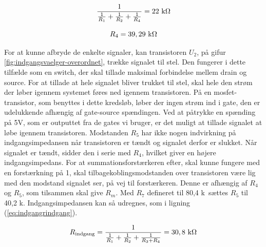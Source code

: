 \begin{equation}
\label{eq:indgangr4udregning}
\frac{1}{\frac{1}{R_1}+\frac{1}{R_2}+\frac{1}{R_4}}=22~\mathrm{k}\ohm
\end{equation}

\begin{equation}
\label{eq:indgangr4}
R_4=39,29~\mathrm{k}\ohm
\end{equation}

For at kunne afbryde de enkelte signaler, kan transistoren $U_2$, på gifur \ref{fig:indgangsvaelger-overordnet}, trække signalet til stel. Den fungerer i dette tilfælde som en switch, der skal tillade maksimal forbindelse mellem drain og source. For at tillade at hele signalet bliver trukket til stel, skal hele den strøm der løber igennem systemet føres ned igennem transistoren. På en mosfet-transistor, som benyttes i dette kredsløb, løber der ingen strøm ind i gate, den er udelukkende afhængig af gate-source spændingen. Ved at påtrykke en spænding på 5V, som er outputtet fra de gates vi bruger, er det muligt at tillade signalet at løbe igennem transistoren.
Modstanden $R_5$ har ikke nogen indvirkning på indgangsimpedansen når transistoren er tændt og signalet derfor er slukket. Når signalet er tændt, sidder den i serie med $R_4$, hvilket giver en højere indgangsimpedans. For at summationsforstærkeren efter, skal kunne fungere med en forstærkning på 1, skal tilbagekoblingsmodstanden over transistoren være lig med den modstand signalet ser, på vej til forstærkeren. Denne er afhængig af $R_4$ og $R_5$, som tilsammen skal give $R_m$. Med $R_7$ defineret til 80,4 k\ohm~sættes $R_5$ til 40,2 k\ohm. Indgangsimpedansen kan så udregnes, som i ligning (\ref{eq:indgangrindgang}).


\begin{equation}
\label{eq:indgangrindgang}
R_{\mathrm{indgang}}=\frac{1}{\frac{1}{R_1}+\frac{1}{R_2}+\frac{1}{R_3+R_4}}=30,8~\mathrm{k}\ohm
\end{equation}

